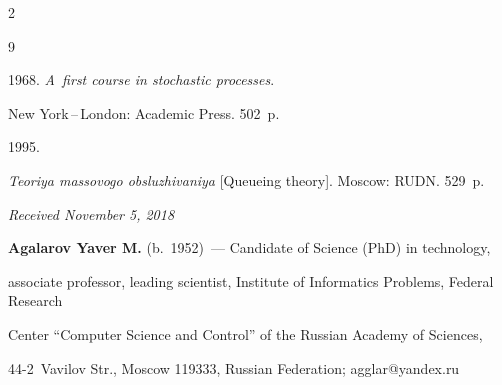 \begin{multicols}{2}
{{\begin{thebibliography}{9}


 1968. \textit{A~first course in stochastic processes}. 


New York\,--\,London: Academic Press. 502~p.




 1995. 


\textit{Teoriya massovogo obsluzhivaniya} [Queueing theory]. Moscow: RUDN. 529~p.


\end{thebibliography}





 }


 }





\end{multicols}





\vspace*{-6pt}





\hfill{\small\textit{Received November 5, 2018}}















\Contr





\noindent


\textbf{Agalarov Yaver M.} (b.\ 1952)~--- Candidate of Science (PhD) in technology,


associate professor, leading scientist, Institute of Informatics Problems, Federal Research 


Center ``Computer Science and Control'' of the Russian Academy of Sciences, 


44-2~Vavilov Str., Moscow 119333, Russian Federation; \mbox{agglar@yandex.ru}





\vspace*{3pt}





